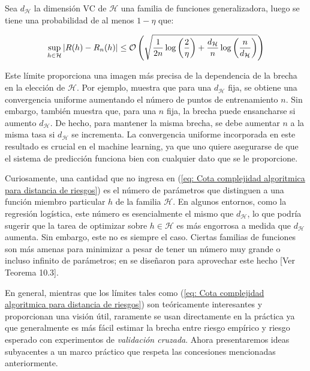 \begin{proposition}
	Sea $d_{ \mathcal{H} }$ la dimensi\'on VC de $\mathcal{H}$ una familia de funciones generalizadora, luego se tiene una probabilidad de al menos $1 - \eta$ que:

\begin{equation}
\label{eq: Cota complejidad algoritmica para distancia de riesgos}
\sup\limits_{h \in \mathcal{H}} {\left\lvert R(h) - R_n(h)\right\rvert} \leq \mathcal{O} \left( \sqrt{\frac{1}{2n} \log \left(\frac{2}{\eta}\right) + \frac{d_{\mathcal{H}}}{n} \log \left( \frac{n}{d_{\mathcal{H}}} \right) } \right)
\end{equation}

\end{proposition}

Este l\'imite proporciona una imagen m\'as precisa de la dependencia de la brecha en la elecci\'on de $\mathcal{H}$. Por ejemplo, muestra que para una $d_{ \mathcal{H} }$ fija, se obtiene una convergencia uniforme aumentando el n\'umero de puntos de entrenamiento $n$. Sin embargo, tambi\'en muestra que, para una $n$ fija, la brecha puede ensancharse si aumento $d_{ \mathcal{H} }$. De hecho, para mantener la misma brecha, se debe aumentar $n$ a la misma tasa si $d_{ \mathcal{H} }$ se incrementa. La convergencia uniforme incorporada en este resultado es crucial en el machine learning, ya que uno quiere asegurarse de que el sistema de predicci\'on funciona bien con cualquier dato que se le proporcione. 


Curiosamente, una cantidad que no ingresa en (\ref{eq: Cota complejidad algoritmica para distancia de riesgos}) es el n\'umero de par\'ametros que distinguen a una funci\'on miembro particular $h$ de la familia $\mathcal{H}$. En algunos entornos, como la regresi\'on log\'istica, este n\'umero es esencialmente el mismo que $d_{ \mathcal{H} }$, lo que podr\'ia sugerir que la tarea de optimizar sobre $h \in \mathcal{H} $ es m\'as engorrosa a medida que $d_{ \mathcal{H} }$ aumenta. Sin embargo, este no es siempre el caso. Ciertas familias de funciones son m\'as amenas para minimizar a pesar de tener un n\'umero muy grande o incluso infinito de par\'ametros; en \cite{vapnik:1998} se dise\~naron para aprovechar este hecho [Ver Teorema 10.3].

En general, mientras que los l\'imites tales como (\ref{eq: Cota complejidad algoritmica para distancia de riesgos}) son te\'oricamente interesantes y proporcionan una visi\'on \'util, raramente se usan directamente en la pr\'actica ya que generalmente es m\'as f\'acil estimar la brecha entre riesgo emp\'irico y riesgo esperado con experimentos de \textit{validaci\'on cruzada}. Ahora presentaremos ideas subyacentes a un marco pr\'actico que respeta las concesiones mencionadas anteriormente.

